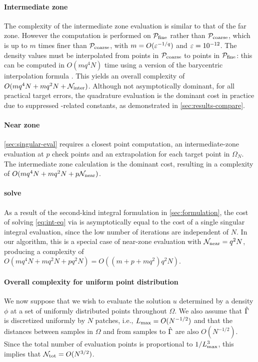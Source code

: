 \paragraph{Intermediate zone} The complexity of the intermediate zone evaluation is similar to that of the far zone.
However the computation is performed on ${\mathcal{P}_{\mathrm{fine}}}$ rather than ${\mathcal{P}_{\mathrm{coarse}}}$, which is up to $m$ times finer than ${\mathcal{P}_{\mathrm{coarse}}}$,  with $m = O(\varepsilon^{-1/q})$ and $\varepsilon=10^{-12}$.
The density values must be interpolated from points in ${\mathcal{P}_{\mathrm{coarse}}}$ to points in ${\mathcal{P}_{\mathrm{fine}}}$: this can be computed in $O(mq^4N)$ time using a \twod version of the barycentric interpolation formula \cite{BT}.
This yields an overall complexity of  $O(mq^4N + m q^2N + \mathcal{N}_{\mathrm{inter}})$.
Although not asymptotically dominant, for all practical target errors, the quadrature evaluation is the dominant cost in practice due to suppressed \fmm-related constants, as demonstrated in \cref{sec:results-compare}.

\paragraph{Near zone} %
\cref{sec:singular-eval} requires a closest point computation, an intermediate-zone evaluation at $p$ check points and an extrapolation for each target point in $\Omega_N$.
The intermediate zone calculation is the dominant cost, resulting in a complexity of $O(mq^4N + m q^2 N + p\mathcal{N}_{\mathrm{near}})$.

\paragraph{\gmres solve} As a result of the second-kind integral formulation in \cref{sec:formulation}, the cost of solving \cref{eq:int-eq} via \gmres is asymptotically equal to the cost of a single singular integral evaluation, since the low number of iterations are independent of $N$.  
In our algorithm, this is a special case of near-zone evaluation with $\mathcal{N}_{\mathrm{near}} = q^2N$, producing a complexity of $O(mq^4N + mq^2N + pq^2N) =O( (m+p+mq^2) q^2 N)$. 

\paragraph{Overall complexity for uniform point distribution}
We now suppose that we wish to evaluate the solution $u$ determined by a density $\phi$ at a set of uniformly distributed points throughout $\Omega$.
We also assume that $\hat{\Gamma}$ is discretized uniformly by $N$ patches, i.e., $L_{\mathrm{max}} = O(N^{-1/2})$ and that the distances between samples in $\Omega$ and from samples to $\hat{\Gamma}$ are also $O(N^{-1/2})$.
Since the total number of evaluation points is proportional to $1/L_{\mathrm{max}}^3$, this implies that $\mathcal{N}_{\mathrm{tot}} = O(N^{3/2})$.

